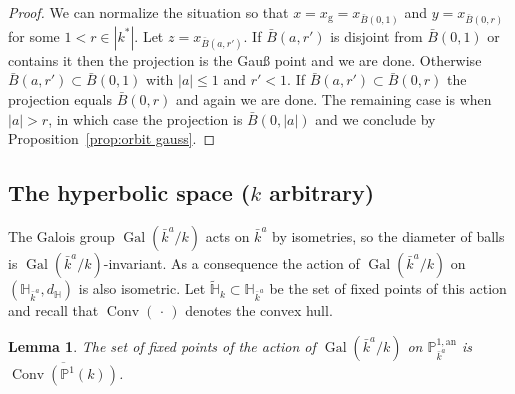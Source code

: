 \documentclass[11pt]{article}
\newtheorem{lemm}[theo]{Lemma}
\theoremstyle{definition}
\numberwithin{equation}{section}
\numberwithin{figure}{section}
\numberwithin{table}{section}
\DeclareMathOperator{\Gal}{Gal}
\DeclareMathOperator{\conv}{Conv}
\newcommand{\hh}{\mathbb{H}}
\newcommand{\an}{\mathrm{an}}
\newcommand{\abs}[1]{\left\vert#1\right\vert}
\newcommand{\PP}{\mathbb{P}}
\begin{document}
\begin{proof}
We can normalize the situation so that $x = x_{\mathrm{g}} = x_{\bar B(0,1)}$ and $y = x_{\bar B(0,r)}$ for some $1<r\in |k^*|$. Let $z = x_{\bar B(a, r')}$. If $\bar B(a, r')$ is disjoint from $\bar B(0,1)$ or contains it then the projection is the Gau{\ss} point and we are done. Otherwise $\bar B(a, r') \subset \bar B(0,1)$ with $\abs{a}\leq 1$ and $r'<1$. If $\bar B(a, r') \subset \bar B(0,r)$ the projection equals $\bar B(0,r)$ and again we are done. The remaining case is when $\abs{a} >r $, in which case the projection is $\bar B(0,\abs{a})$ and we conclude by Proposition~\ref{prop:orbit gauss}.
\end{proof}

\subsection{The hyperbolic space (\texorpdfstring{$k$}{k} arbitrary)} \label{subs:hyperbolic arbitrary}

The Galois group $\Gal(\bar{k}^a/k)$ acts on $\bar{k}^a$ by isometries, so the diameter of balls is $\Gal(\bar{k}^a/k)$-invariant. As a consequence the action of $\Gal(\bar{k}^a/k)$ on $(\hh_{\bar{k}^a},d_\hh)$ is also isometric. Let $\widetilde{\hh}_k\subset\hh_{\bar{k}^a}$ be the set of fixed points of this action and recall that $\conv({\,\cdot\,})$ denotes the convex hull.

\begin{lemm}\label{lem:fixx}
The set of fixed points of the action of $\Gal(\bar{k}^a/k)$ on $\PP^{1,\an}_{\bar{k}^a}$ is $\overline{\conv(\PP^1(k))}$.
\end{lemm}
\end{document}

